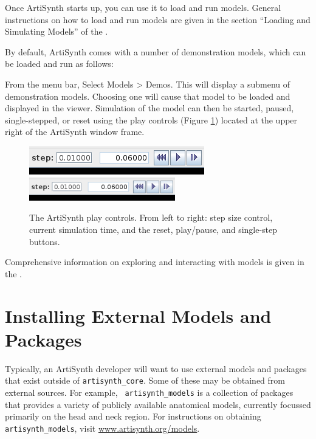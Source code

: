 Once ArtiSynth starts up, you can use it to load and run
models. General instructions on how to load and run models are given
in the section ``Loading and Simulating Models'' of the
. 

By default, ArtiSynth comes with a number of demonstration models,
which can be loaded and run as follows:

From the menu bar, Select {\sf Models > Demos}.  This will display a
submenu of demonstration models. Choosing one will cause that model to
be loaded and displayed in the viewer.  Simulation of the model can
then be started, paused, single-stepped, or reset using the play
controls (Figure \ref{PlayControlsFig}) located at the upper right of
the ArtiSynth window frame.

\begin{figure}
\begin{center}
\iflatexml
\includegraphics[]{images/playControls}
\else
\includegraphics[width=2.5in]{images/playControls}
\fi
\end{center}
\caption{The ArtiSynth play controls. From left to right: step size
control, current simulation time, and the reset, play/pause, and
single-step buttons.}%
\label{PlayControlsFig}
\end{figure}

Comprehensive information on exploring and interacting with models is
given in the
.

\section{Installing External Models and Packages}
\label{AdditionalModelsAndPackages}

Typically, an ArtiSynth developer will want to use external models and
packages that exist outside of {\tt artisynth\_core}.  Some of these
may be obtained from external sources.  For example, {\tt
artisynth\_models} is a collection of packages that provides a variety
of publicly available anatomical models, currently focussed primarily
on the head and neck region. For instructions on obtaining {\tt
artisynth\_models}, visit 
\href{https://www.artisynth.org/models}{www.artisynth.org/models}.


